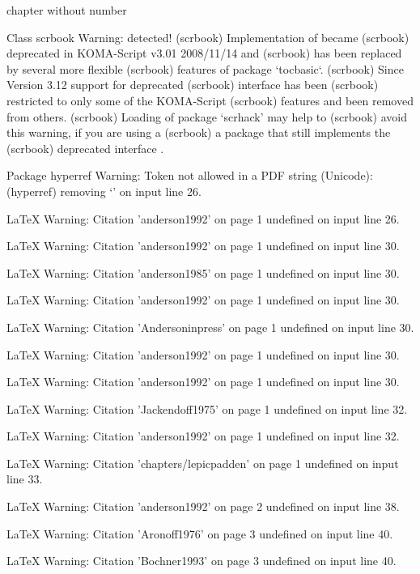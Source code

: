 chapter without number

Class scrbook Warning: \float@addtolists detected!
(scrbook)              Implementation of \float@addtolist became
(scrbook)              deprecated in KOMA-Script v3.01 2008/11/14 and
(scrbook)              has been replaced by several more flexible
(scrbook)              features of package `tocbasic`.
(scrbook)              Since Version 3.12 support for deprecated
(scrbook)              \float@addtolist interface has been
(scrbook)              restricted to only some of the KOMA-Script
(scrbook)              features and been removed from others.
(scrbook)              Loading of package `scrhack' may help to
(scrbook)              avoid this warning, if you are using a
(scrbook)              a package that still implements the
(scrbook)              deprecated \float@addtolist interface .


Package hyperref Warning: Token not allowed in a PDF string (Unicode):
(hyperref)                removing `\newline' on input line 26.


LaTeX Warning: Citation 'anderson1992' on page 1 undefined on input line 26.


LaTeX Warning: Citation 'anderson1992' on page 1 undefined on input line 30.


LaTeX Warning: Citation 'anderson1985' on page 1 undefined on input line 30.


LaTeX Warning: Citation 'anderson1992' on page 1 undefined on input line 30.


LaTeX Warning: Citation 'Andersoninpress' on page 1 undefined on input line 30.


LaTeX Warning: Citation 'anderson1992' on page 1 undefined on input line 30.


LaTeX Warning: Citation 'anderson1992' on page 1 undefined on input line 30.


LaTeX Warning: Citation 'Jackendoff1975' on page 1 undefined on input line 32.


LaTeX Warning: Citation 'anderson1992' on page 1 undefined on input line 32.


LaTeX Warning: Citation 'chapters/lepicpadden' on page 1 undefined on input line 33.


LaTeX Warning: Citation 'anderson1992' on page 2 undefined on input line 38.


LaTeX Warning: Citation 'Aronoff1976' on page 3 undefined on input line 40.


LaTeX Warning: Citation 'Bochner1993' on page 3 undefined on input line 40.


